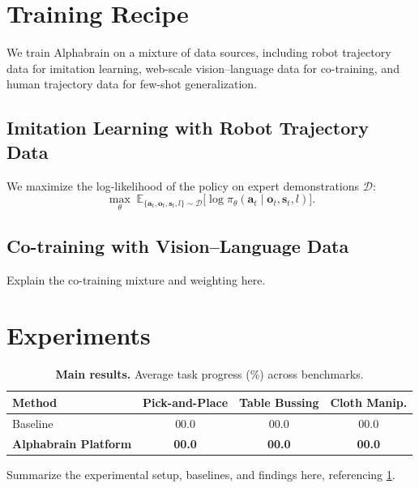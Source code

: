 \documentclass[11pt]{article}
\newcommand{\model}{\mbox{Alphabrain}}
\newcommand{\platform}{Alphabrain Platform}
\begin{document}
\section{Training Recipe}\label{sec:recipe}
We train \model{} on a mixture of data sources, including robot trajectory data
for imitation learning, web-scale vision–language data for co-training, and human
trajectory data for few-shot generalization.

\subsection{Imitation Learning with Robot Trajectory Data}
We maximize the log-likelihood of the policy on expert demonstrations
$\mathcal{D}$:
\begin{equation}
  \max_\theta\;
  \mathbb{E}_{\{\mathbf{a}_t,\mathbf{o}_t,\mathbf{s}_t,l\}\sim\mathcal{D}}
  \big[\log \pi_\theta(\mathbf{a}_t\mid\mathbf{o}_t,\mathbf{s}_t,l)\big].
\end{equation}

\subsection{Co-training with Vision–Language Data}
Explain the co-training mixture and weighting here.

\section{Experiments}\label{sec:exp}
\begin{table}[t]
  \centering
  \caption{\textbf{Main results.} Average task progress (\%) across benchmarks.}
  \label{tab:main}
  \begin{tabular}{lccc}
    \toprule
    Method & Pick-and-Place & Table Bussing & Cloth Manip. \\
    \midrule
    Baseline           & 00.0 & 00.0 & 00.0 \\
    \rowcolor{abMist}
    \textbf{\platform{}} & \textbf{00.0} & \textbf{00.0} & \textbf{00.0} \\
    \bottomrule
  \end{tabular}
\end{table}

Summarize the experimental setup, baselines, and findings here, referencing
\cref{tab:main}.
\end{document}
